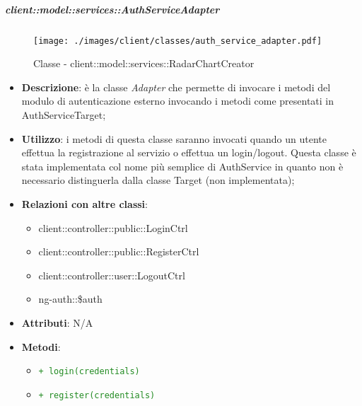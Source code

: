 		\subparagraph{client::model::services::AuthServiceAdapter} %
		\label{subp:client_model_services_authservice}
		\begin{figure}[htbp]
				\centering
				\centerline{\texttt{[image: ./images/client/classes/auth\_service\_adapter.pdf]}}
				\caption{Classe - client::model::services::RadarChartCreator}
			\end{figure}
			\begin{itemize}
				\item \textbf{Descrizione}: è la classe \emph{Adapter} che permette di invocare i metodi del modulo di autenticazione esterno invocando i metodi come presentati in AuthServiceTarget;
				\item \textbf{Utilizzo}:  i metodi di questa classe saranno invocati quando un utente effettua la registrazione al servizio o effettua un login/logout. Questa classe è stata implementata col nome più semplice di AuthService in quanto non è necessario distinguerla dalla classe Target (non implementata);
				\item \textbf{Relazioni con altre classi}:
					\begin{itemize}
						\item client::controller::public::LoginCtrl
						\item client::controller::public::RegisterCtrl
						\item client::controller::user::LogoutCtrl
						\item ng-auth::\$auth
					\end{itemize}
				\item \textbf{Attributi}: N/A
				\item \textbf{Metodi}:
				\begin{itemize}
					\item \textcolor{forestgreen}{\texttt{+ login(credentials)}}
					\item \textcolor{forestgreen}{\texttt{+ register(credentials)}}
\end{itemize}
\end{itemize}
